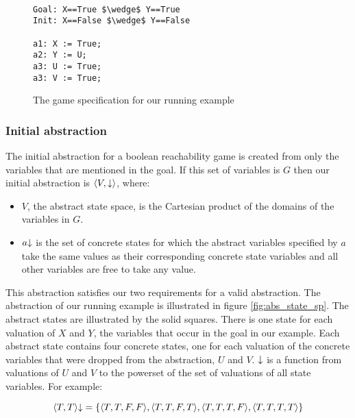 \begin{figure}
    \begin{lstlisting}[mathescape]

Goal: X==True $\wedge$ Y==True
Init: X==False $\wedge$ Y==False

a1: X := True;
a2: Y := U;
a3: U := True;
a3: V := True;

\end{lstlisting}
\caption{The game specification for our running example}
\label{fig:running_example}
\end{figure}

\subsubsection{Initial abstraction}

The initial abstraction for a boolean reachability game is created from only the variables that are mentioned in the goal. If this set of variables is $G$ then our initial abstraction is $\langle V, \mathord{\downarrow} \rangle$, where:
\begin{itemize}
    \item $V$, the abstract state space, is the Cartesian product of the domains of the variables in $G$.
    \item $a\mathord{\downarrow}$ is the set of concrete states for which the abstract variables specified by $a$ take the same values as their corresponding concrete state variables and all other variables are free to take any value.
\end{itemize}

This abstraction satisfies our two requirements for a valid abstraction. The abstraction of our running example is illustrated in figure \ref{fig:abs_state_sp}. The abstract states are illustrated by the solid squares. There is one state for each valuation of $X$ and $Y$, the variables that occur in the goal in our example. Each abstract state contains four concrete states, one for each valuation of the concrete variables that were dropped from the abstraction, $U$ and $V$. $\mathord{\downarrow}$ is a function from valuations of $U$ and $V$ to the powerset of the set of valuations of all state variables. For example:

\begin{equation}
    \langle T, T \rangle\mathord{\downarrow} = \{ \langle T, T, F, F \rangle, \langle T, T, F, T \rangle, \langle T, T, T, F \rangle, \langle T, T, T, T \rangle \}
\end{equation}

